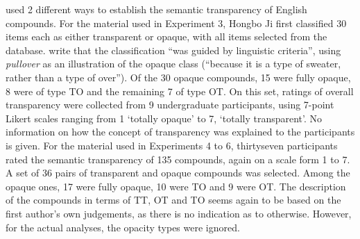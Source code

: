 


\citet{Jietal:2011} used 2 different ways to establish the semantic
transparency of English compounds. For the material used in Experiment 3, Hongbo Ji
first classified 30 items each as either transparent or opaque, with all items
selected from the  database.\nocite{Baayenetal:1995} \citet[412]{Jietal:2011} write that the
classification ``was guided by linguistic criteria'', using \emph{pullover} as
an illustration of the opaque class (``because it is a type of sweater, rather
than a type of over''). Of the 30 opaque compounds, 15 were fully opaque, 8
were of type TO and the remaining 7 of type OT. On this set, ratings of
overall transparency were collected from 9 undergraduate participants, using
7-point Likert scales ranging from 1 `totally opaque' to 7, `totally
transparent'. No information on how the concept of transparency was explained
to the participants is given.  For the material used in Experiments 4 to 6, thirtyseven
participants rated the semantic transparency of 135  compounds, again on
a scale form 1 to 7. A set of 36 pairs of transparent and opaque compounds was
selected. Among the opaque ones, 17 were fully opaque, 10 were TO and 9 were
OT. The description of the compounds in terms of TT, OT and TO seems again to
be based on
the first author's own judgements, as there is no indication as to otherwise. However, for the actual analyses, the opacity types were ignored.


